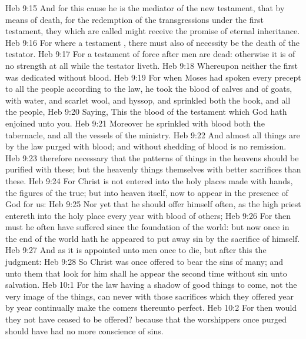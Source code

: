 \vs Heb 9:15 And for this cause he is the mediator of the new testament, that by means of death, for the redemption of the transgressions  under the first testament, they which are called might receive the promise of eternal inheritance.
\vs Heb 9:16 For where a testament , there must also of necessity be the death of the testator.
\vs Heb 9:17 For a testament  of force after men are dead: otherwise it is of no strength at all while the testator liveth.
\vs Heb 9:18 Whereupon neither the first  was dedicated without blood.
\vs Heb 9:19 For when Moses had spoken every precept to all the people according to the law, he took the blood of calves and of goats, with water, and scarlet wool, and hyssop, and sprinkled both the book, and all the people,
\vs Heb 9:20 Saying, This  the blood of the testament which God hath enjoined unto you.
\vs Heb 9:21 Moreover he sprinkled with blood both the tabernacle, and all the vessels of the ministry.
\vs Heb 9:22 And almost all things are by the law purged with blood; and without shedding of blood is no remission.
\vs Heb 9:23  therefore necessary that the patterns of things in the heavens should be purified with these; but the heavenly things themselves with better sacrifices than these.
\vs Heb 9:24 For Christ is not entered into the holy places made with hands,  the figures of the true; but into heaven itself, now to appear in the presence of God for us:
\vs Heb 9:25 Nor yet that he should offer himself often, as the high priest entereth into the holy place every year with blood of others;
\vs Heb 9:26 For then must he often have suffered since the foundation of the world: but now once in the end of the world hath he appeared to put away sin by the sacrifice of himself.
\vs Heb 9:27 And as it is appointed unto men once to die, but after this the judgment:
\vs Heb 9:28 So Christ was once offered to bear the sins of many; and unto them that look for him shall he appear the second time without sin unto salvation.
\vs Heb 10:1 For the law having a shadow of good things to come,  not the very image of the things, can never with those sacrifices which they offered year by year continually make the comers thereunto perfect.
\vs Heb 10:2 For then would they not have ceased to be offered? because that the worshippers once purged should have had no more conscience of sins.
